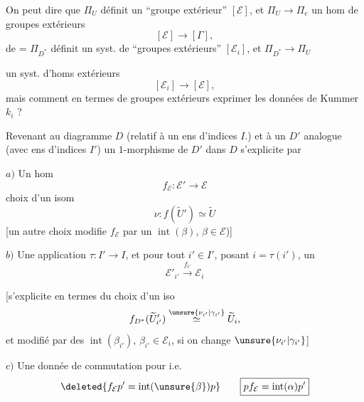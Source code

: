On peut dire que $\Pi_U$ définit un ``groupe extérieur'' $[\mathcal E]$, et $\Pi_U\longrightarrow\Pi_e$ un hom de groupes extérieurs
\[
[\mathcal E]\longrightarrow[\Gamma],
\]
de = $\Pi_{D^*}$ définit un syst. de ``groupes extérieurs'' $[\mathcal E_i]$, et  $\Pi_{D^*}\longrightarrow\Pi_U$


un syst. d'homs extérieurs
\[
[\mathcal E_i]\longrightarrow[\mathcal E],
\]
 mais comment en termes de groupes extérieurs exprimer les données de Kummer $k_i$ ?

Revenant au  diagramme $D$ (relatif à un ens d'indices $I$.) et à un $D'$ analogue (avec ens d'indices $I'$)
un $1$-morphisme  de $D'$ dans $D$ s'explicite par

$a)$ Un hom
\[
\boxed{\boxed{f_{\mathcal E}:\mathcal E'\longrightarrow\mathcal E}}
\]
 choix d'un isom
\[
\nu:f(\widetilde U')\simeq\widetilde U
\]
[un autre choix modifie $f_{\mathcal E}$ par un $\operatorname{int}(\beta)$, $\beta\in\mathcal E$)]

$b)$ Une  application $\tau:I'\longrightarrow I$, et pour tout $i'\in I'$, posant $i=\tau(i')$, un 
\[
\boxed{\mathcal E'_{i'}\xrightarrow{f_{i'}}\mathcal E_i}
\]


[s'explicite en termes du choix d'un iso
\[
f_{D^*}(\widetilde U'_{i'})\overset{\unsure{\nu_{i'}|\gamma_{i'}}}{\simeq}\widetilde U_i,
\]
et modifié par des $\operatorname{int}(\beta_{i'})$, $\beta_{i'}\in\mathcal E_i$, si on change $\unsure{\nu_{i'}|\gamma_{i'}}$]

$c)$ Une donnée de commutation pour
i.e.
\[
\deleted{f_{\mathcal E}p'=\operatorname{int}(\unsure{\beta})p}
\qquad\boxed{pf_{\mathcal E}=\operatorname{int}(\alpha)p'}
\]

